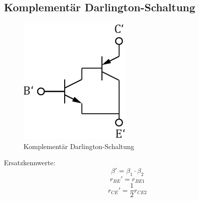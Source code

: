 \subsection{Komplementär Darlington-Schaltung}
\begin{figure}[h!]
	\centering
	\includegraphics[scale = 0.6]{darlington_komp.pdf}
	\caption{Komplementär Darlington-Schaltung}
	\label{trans:darlington_komp}
\end{figure}
\noindent
Ersatzkennwerte:
\[ \beta' = \beta_1 \cdot \beta_2 \]
\[ r_{BE}' = r_{BE1} \]
\[ r_{CE}' = \frac{1}{2} r_{CE2} \]